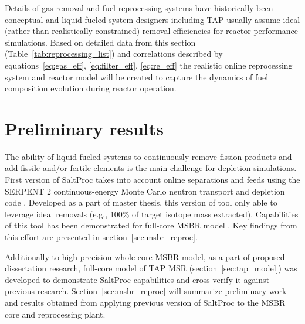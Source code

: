 Details of gas removal and fuel reprocessing systems have historically been conceptual 
and liquid-fueled system designers including \gls{TAP} usually assume ideal (rather 
than realistically constrained) removal efficiencies for reactor performance simulations.
Based on detailed data from this section (Table~\ref{tab:reprocessing_list}) and 
correlations described by equations~\ref{eq:gas_eff}, \ref{eq:filter_eff}, \ref{eq:re_eff} the realistic 
online reprocessing system and reactor model will be created to capture the dynamics 
of fuel composition evolution during reactor operation.


\section{Preliminary results}
The ability of liquid-fueled systems to continuously remove fission products and add 
fissile and/or fertile elements is the main challenge for depletion simulations. 
First version of SaltProc takes into account online separations and feeds using the 
SERPENT 2 continuous-energy Monte Carlo neutron transport and depletion code 
\cite{rykhlevskii_arfc/saltproc_2018}. Developed as a part of master thesis, this 
version of tool only able to leverage ideal 
removals (e.g., 100\% of target isotope mass extracted). Capabilities of this tool 
has been demonstrated for full-core \gls{MSBR} model \cite{rykhlevskii_modeling_2019}. 
Key findings from this effort are presented in section~\ref{sec:msbr_reproc}.

Additionally to high-precision whole-core \gls{MSBR} model, as a part of 
proposed dissertation research, full-core model of 
\gls{TAP} \gls{MSR} (section~\ref{sec:tap_model}) was developed to 
demonstrate SaltProc capabilities and cross-verify it against previous research. 
Section~\ref{sec:msbr_reproc} will summarize preliminary work and results 
obtained from applying previous version of SaltProc to the \gls{MSBR} core and 
reprocessing plant.

